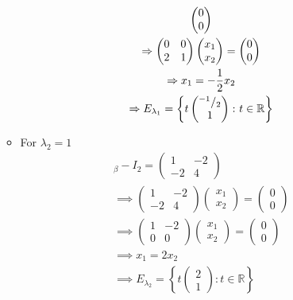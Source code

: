 \begin{enumerate}
\begin{itemize}
\begin{gather}
\begin{pmatrix}
  0\\
  0
\end{pmatrix}\\
\Rightarrow
\begin{pmatrix}
0 & 0\\
2 & 1
\end{pmatrix}
\begin{pmatrix}
x_1\\
x_2
\end{pmatrix}
=
\begin{pmatrix}
  0\\
  0
\end{pmatrix}\\
\Rightarrow x_1 = -\frac{1}{2}x_2\\
\Rightarrow E_{\lambda_1} =
\left\{t\begin{pmatrix}^{-1}/_{2}\\1\end{pmatrix}\colon t \in \mathbb{R}\right\}
\end{gather}
\item For $\lambda_2 = 1$
\begin{gather}
[\mathsf{T}]_\beta - I_2 = \begin{pmatrix}
1 & -2\\
-2 & 4
\end{pmatrix}\\
\implies \begin{pmatrix}
1 & -2\\
-2 & 4
\end{pmatrix}
\begin{pmatrix}
x_1\\
x_2
\end{pmatrix}
=
\begin{pmatrix}
  0\\
  0
\end{pmatrix}\\
\implies \begin{pmatrix}
1 & -2\\
0 & 0
\end{pmatrix}
\begin{pmatrix}
x_1\\
x_2
\end{pmatrix}
=
\begin{pmatrix}
  0\\
  0
\end{pmatrix}\\
\implies x_1 = 2x_2\\
\implies E_{\lambda_2} =
\left\{t\begin{pmatrix}2\\1\end{pmatrix}\colon t \in \mathbb{R}\right\}

\end{gather}
\end{itemize}
\end{enumerate}
